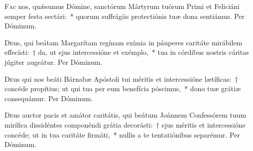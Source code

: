 \documentclass[vesperale_romanum.tex]{subfiles}
\begin{document}
\myrule


\oratio

\lettrine{F}{a}c nos, quǽsumus Dómine, san\-ctórum Mártyrum tuórum Primi et Feliciáni semper festa se\-ctári:~* quorum suffrágiis prote\-ctiónis tuæ dona sentiámus. Per Dóminum.

\myrule


\semiduplex

\oratio

\lettrine{D}{e}us, qui beátam Margarítam regínam exímia in páuperes caritáte mirábilem effecísti:~† da, ut ejus intercessióne et exémplo,~* tua in córdibus nostris cáritas júgiter augeátur. Per Dóminum.


\capitdeseq
\myrule

\newpage


\duplexmajus

\oratio

\lettrine{D}{e}us qui nos beáti Bárnabæ Apóstoli tui méritis et intercessióne lætíficas:~† concéde propítius; ut qui tua per eum benefícia póscimus,~* dono tuæ grátiæ consequámur.
Per Dóminum.



\myrule


\duplex


\oratio
\lettrine{D}{e}us auctor pacis et amátor caritátis, qui beátum Joánnem Confessórem tuum mirífica dissidéntes componéndi grátia decorásti:~† ejus méritis et intercessióne concéde; ut in tua caritáte firmáti,~* nullis a te tentatiónibus separémur. Per Dóminum.

\end{document}
